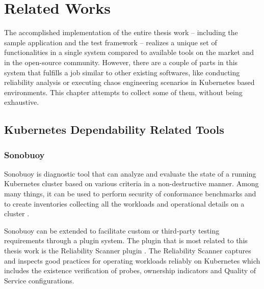 \chapter{Related Works}

The accomplished implementation of the entire thesis work -- including the sample application and the test framework -- realizes a unique set of functionalities in a single system compared to available tools on the market and in the open-source community. However, there are a couple of parts in this system that fulfills a job similar to other existing softwares, like conducting reliability analysis or executing chaos engineering scenarios in Kubernetes based environments. This chapter attempts to collect some of them, without being exhaustive.

\section{Kubernetes Dependability Related Tools}

\subsection{Sonobuoy}

Sonobuoy is diagnostic tool that can analyze and evaluate the state of a running Kubernetes cluster based on various criteria in a non-destructive manner. Among many things, it can be used to perform security of conformance benchmarks and to create inventories collecting all the workloads and operational details on a cluster \cite{Sonobuoy}.

Sonobuoy can be extended to facilitate custom or third-party testing requirements through a plugin system. The plugin that is most related to this thesis work is the Reliability Scanner plugin \cite{SonobuoyReliabilityScanner}. The Reliability Scanner captures and inspects good practices for operating workloads reliably on Kubernetes which includes the existence verification of  probes, ownership indicators and Quality of Service configurations.

